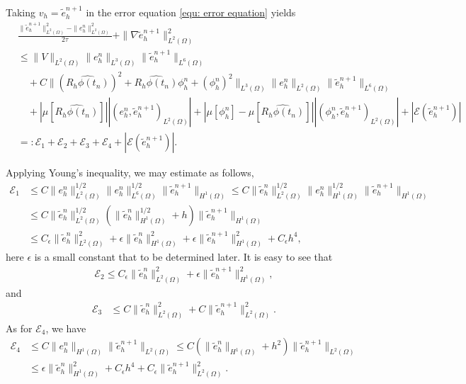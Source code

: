 \documentclass{siamart250211}
\def\eps{\epsilon}
\begin{document}
Taking $v_h = \tilde{e}_h^{n+1}$ in the error equation \eqref{equ: error equation} yields 
\begin{align*}
	& \frac{\|\tilde{e}_h^{n+1}\|_{L^2(\Omega)}^2 - \|e_h^n\|_{L^2(\Omega)}^2}{2\tau} + \|\nabla \tilde{e}_h^{n+1}\|_{L^2(\Omega)}^2 \\
	& \le \|V\|_{L^{2}(\Omega)}\|e_h^n\|_{L^3(\Omega)}\|\tilde{e}_h^{n+1}\|_{L^6(\Omega)} \\
	&\quad + C \|(\widehat{R_h\phi(t_n)})^2 + \widehat{R_h\phi(t_n)}\phi_h^n + (\phi_h^n)^2\|_{L^3(\Omega)}\|e_h^n\|_{L^2(\Omega)}\|\tilde{e}_h^{n+1}\|_{L^6(\Omega)} \\
	& \quad + |\mu[\widehat{R_h\phi(t_n)}]| |(e_h^n,\tilde{e}_h^{n+1})_{L^2(\Omega)}| + |\mu[\phi_h^n] - \mu[\widehat{R_h\phi(t_n)}]||(\phi_h^n,\tilde{e}_h^{n+1})_{L^2(\Omega)}| + |\mathcal{E}(\tilde{e}_h^{n+1})| \\
	&=: \mathcal{E}_1 + \mathcal{E}_2 + \mathcal{E}_3 + \mathcal{E}_4 + |\mathcal{E}(\tilde{e}_h^{n+1})|.
\end{align*}

Applying Young's inequality, we may estimate as follows, 
\begin{align*}
	\mathcal{E}_1 & \le C \|e_h^n\|_{L^2(\Omega)}^{1/2}\|e_h^n\|_{L^6(\Omega)}^{1/2}\|\tilde{e}_h^{n+1}\|_{H^1(\Omega)}  \le C \|\tilde{e}_h^{n}\|_{L^2(\Omega)}^{1/2}\|e_h^n\|_{H^1(\Omega)}^{1/2}\|\tilde{e}_h^{n+1}\|_{H^1(\Omega)} \\
	& \le C \|\tilde{e}_h^{n}\|_{L^2(\Omega)}^{1/2} (\|\tilde{e}_h^{n}\|_{H^1(\Omega)}^{1/2} + h)\|\tilde{e}_h^{n+1}\|_{H^1(\Omega)} \\
	& \le C_{\eps} \|\tilde{e}_h^{n}\|_{L^2(\Omega)}^2 + \eps \|\tilde{e}_h^{n}\|_{H^1(\Omega)}^2 + \eps \|\tilde{e}_h^{n+1}\|_{H^1(\Omega)}^2 + C_{\eps} h^4,
\end{align*}
here $\eps$ is a small constant that to be determined later. It is easy to see that
\begin{align*}
	\mathcal{E}_2  \le C_{\eps} \|\tilde{e}_h^{n}\|_{L^2(\Omega)}^2 + \eps \|\tilde{e}_h^{n+1}\|_{H^1(\Omega)}^2,
\end{align*}
and
\begin{align*}
	\mathcal{E}_3 & \le C \|\tilde{e}_h^n\|_{L^2(\Omega)}^2 + C \|\tilde{e}_h^{n+1}\|_{L^2(\Omega)}^2.
\end{align*}
As for $\mathcal{E}_4$, we have
\begin{align*}
	\mathcal{E}_4 & \le C \|e_h^n\|_{H^1(\Omega)}\|\tilde{e}_h^{n+1}\|_{L^2(\Omega)} \le C(\|\tilde{e}_h^n\|_{H^1(\Omega)} + h^2)\|\tilde{e}_h^{n+1}\|_{L^2(\Omega)} \\
	& \le \eps \|\tilde{e}_h^n\|_{H^1(\Omega)}^2 + C_{\eps} h^4 + C_{\eps} \|\tilde{e}_h^{n+1}\|_{L^2(\Omega)}^2.
\end{align*}
\end{document}
